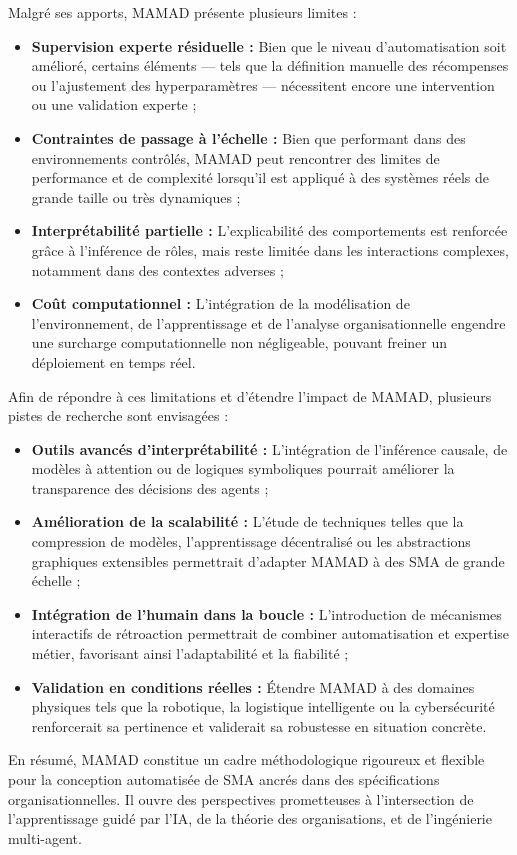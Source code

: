 Malgré ses apports, MAMAD présente plusieurs limites :

\begin{itemize}
    \item \textbf{Supervision experte résiduelle :} Bien que le niveau d'automatisation soit amélioré, certains éléments — tels que la définition manuelle des récompenses ou l'ajustement des hyperparamètres — nécessitent encore une intervention ou une validation experte ;
    \item \textbf{Contraintes de passage à l'échelle :} Bien que performant dans des environnements contrôlés, MAMAD peut rencontrer des limites de performance et de complexité lorsqu'il est appliqué à des systèmes réels de grande taille ou très dynamiques ;
    \item \textbf{Interprétabilité partielle :} L'explicabilité des comportements est renforcée grâce à l'inférence de rôles, mais reste limitée dans les interactions complexes, notamment dans des contextes adverses ;
    \item \textbf{Coût computationnel :} L'intégration de la modélisation de l'environnement, de l'apprentissage et de l'analyse organisationnelle engendre une surcharge computationnelle non négligeable, pouvant freiner un déploiement en temps réel.
\end{itemize}

\noindent Afin de répondre à ces limitations et d'étendre l'impact de MAMAD, plusieurs pistes de recherche sont envisagées :

\begin{itemize}
    \item \textbf{Outils avancés d'interprétabilité :} L'intégration de l'inférence causale, de modèles à attention ou de logiques symboliques pourrait améliorer la transparence des décisions des agents ;
    \item \textbf{Amélioration de la scalabilité :} L'étude de techniques telles que la compression de modèles, l'apprentissage décentralisé ou les abstractions graphiques extensibles permettrait d'adapter MAMAD à des SMA de grande échelle ;
    \item \textbf{Intégration de l'humain dans la boucle :} L'introduction de mécanismes interactifs de rétroaction permettrait de combiner automatisation et expertise métier, favorisant ainsi l'adaptabilité et la fiabilité ;
    \item \textbf{Validation en conditions réelles :} Étendre MAMAD à des domaines physiques tels que la robotique, la logistique intelligente ou la cybersécurité renforcerait sa pertinence et validerait sa robustesse en situation concrète.
\end{itemize}

\noindent En résumé, MAMAD constitue un cadre méthodologique rigoureux et flexible pour la conception automatisée de SMA ancrés dans des spécifications organisationnelles. Il ouvre des perspectives prometteuses à l'intersection de l'apprentissage guidé par l'IA, de la théorie des organisations, et de l'ingénierie multi-agent.


